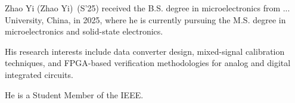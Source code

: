 \documentclass[journal]{IEEEtran}
\begin{document}
\begin{IEEEbiography}{Zhao Yi}
(Zhao Yi)~(S'25) received the B.S. degree in microelectronics from ... University,
China, in 2025, where he is currently pursuing the M.S. degree in microelectronics
and solid-state electronics.

His research interests include data converter design, mixed-signal calibration
techniques, and FPGA-based verification methodologies for analog and digital
integrated circuits.

He is a Student Member of the IEEE.
\end{IEEEbiography}
\end{document}
